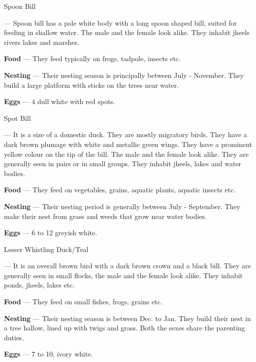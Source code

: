 \begin{bird}{Spoon Bill}

 --- Spoon bill has a pale white body with a long spoon shaped bill, suited for feeding in shallow water. The male and the female look alike. They inhabit jheels rivers lakes and marshes. 

{\large\bf Food} --- They feed typically on frogs, tadpole, insects etc.

{\large\bf Nesting} --- Their nesting season is principally between July - November. They build a large platform with sticks on the trees near water. 

{\large\bf Eggs} --- 4 dull white with red spots.
\end{bird}

\begin{bird}{Spot Bill}

 --- It is a size of a domestic duck. They are mostly migratory birds. They have a dark brown plumage with white and metallic green wings. They have a prominent yellow colour on the tip of the bill. The male and the female look alike. They are generally seen in pairs or in small groups. They inhabit jheels, lakes and water bodies.

{\large\bf Food} --- They feed on vegetables, grains, aquatic plants, aquatic insects etc.

{\large\bf Nesting} --- Their nesting period is generally between July - September. They make their nest from grass and weeds that grow near water bodies. 

{\large\bf Eggs} --- 6 to 12 greyish white.
\end{bird}

\begin{bird}{Lesser Whistling Duck/Teal}

 --- It is an overall brown bird with a dark brown crown and a black bill. They are generally seen in small flocks, the male and the female look alike. They inhabit ponds, jheels, lakes etc. 

{\large\bf Food} --- They feed on small fishes, frogs, grains etc.

{\large\bf Nesting} --- Their nesting season is between Dec. to Jan. They build their nest in a tree hallow, lined up with twigs and grass. Both the sexes share the parenting duties.

{\large\bf Eggs} --- 7 to 10, ivory white.
\end{bird}

